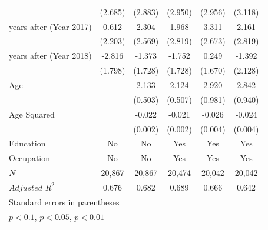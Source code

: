 \documentclass[a4paper,12pt]{article}
\begin{document}
\begin{table}[htbp]
{\begin{tabular}{@{\extracolsep{5pt}}lccccc}
            &     (2.685)         &     (2.883)         &     (2.950)         &     (2.956)         &     (3.118)         \\
\addlinespace
6 years after (Year 2017)&       0.612         &       2.304         &       1.968         &       3.311         &       2.161         \\
            &     (2.203)         &     (2.569)         &     (2.819)         &     (2.673)         &     (2.819)         \\
\addlinespace
7 years after (Year 2018)&      -2.816         &      -1.373         &      -1.752         &       0.249         &      -1.392         \\
            &     (1.798)         &     (1.728)         &     (1.728)         &     (1.670)         &     (2.128)         \\
\addlinespace
Age         &                     &       2.133\sym{***}&       2.124\sym{***}&       2.920\sym{***}&       2.842\sym{***}\\
            &                     &     (0.503)         &     (0.507)         &     (0.981)         &     (0.940)         \\
\addlinespace
Age Squared &                     &      -0.022\sym{***}&      -0.021\sym{***}&      -0.026\sym{***}&      -0.024\sym{***}\\
            &                     &     (0.002)         &     (0.002)         &     (0.004)         &     (0.004)         \\
\midrule
Education   &          No         &          No         &         Yes         &         Yes         &         Yes         \\
Occupation  &          No         &          No         &         Yes         &         Yes         &         Yes         \\
$\textit{N}$&      20,867         &      20,867         &      20,474         &      20,042         &      20,042         \\
$\textit{Adjusted R}^2$&       0.676         &       0.682         &       0.689         &       0.666         &       0.642         \\
\bottomrule
\multicolumn{6}{l}{\footnotesize Standard errors in parentheses}\\
\multicolumn{6}{l}{\footnotesize \sym{*} \(p<0.1\), \sym{**} \(p<0.05\), \sym{***} \(p<0.01\)}\\

\end{tabular}}
\end{table}
\end{document}
